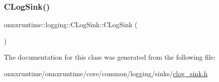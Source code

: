 \subsubsection{\texorpdfstring{C\+Log\+Sink()}{CLogSink()}}
{\footnotesize\ttfamily onnxruntime\+::logging\+::\+C\+Log\+Sink\+::\+C\+Log\+Sink (\begin{DoxyParamCaption}{ }\end{DoxyParamCaption})\hspace{0.3cm}{\ttfamily [inline]}}



The documentation for this class was generated from the following file\+:\begin{DoxyCompactItemize}
\item 
onnxruntime/onnxruntime/core/common/logging/sinks/\mbox{\hyperlink{clog__sink_8h}{clog\+\_\+sink.\+h}}\end{DoxyCompactItemize}
